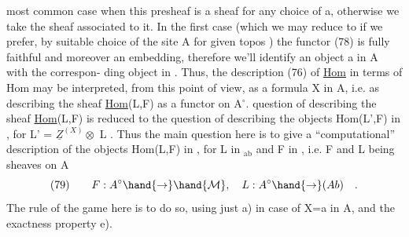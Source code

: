 most common case when this presheaf is  a sheaf for any choice of
a,  otherwise we take the sheaf associated to it.  In the first case
(which we may reduce to if we prefer,  by suitable choice of the site A
for given topos ) the functor (78) is fully faithful and moreover an
embedding,  therefore we'll identify an object a in A with the correspon-%
ding object in .  Thus,  the description (76) of \uline{Hom} in terms of Hom may
be interpreted,  from this point of view,  as a formula  X  in A,
i.e. as describing the sheaf \uline{Hom}(L,F) as a functor on A$^{\circ}$\deleted{\unsure{,}}.  
question of describing the sheaf \uline{Hom}(L,F) is reduced to the question of
describing the objects  Hom(L',F)  in ,  for L' = $\underline{Z}^{(X)}\otimes$ L .  Thus the
main question here is to give a ``computational'' description of the objects
Hom(L,F) in ,  for L in $_{\mathrm{ab}}$  and F in ,  i.e. F and L being
sheaves on A
\[ (79) \qquad F: A^{\circ} \hand{\to} \hand{\mathcal{M}}, \quad L : A^{\circ} \hand{\to} (Ab) \quad . \]
The rule of the game here is to do so,  using just a) in case of X=a in A,
and the exactness property e).

